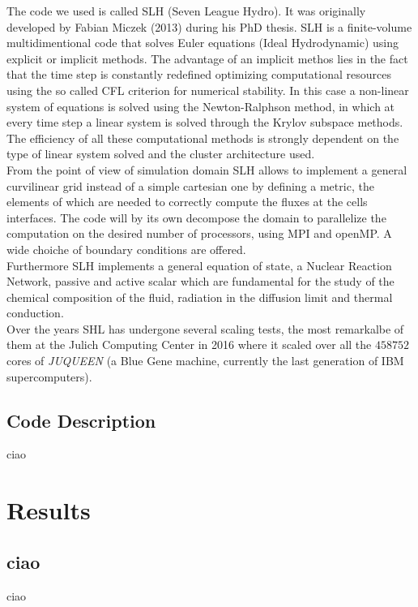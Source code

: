\documentclass[11pt]{article}
\begin{document}
The code we used is called SLH (Seven League Hydro). It was originally developed by Fabian Miczek (2013) during his PhD thesis. SLH is a finite-volume multidimentional code that solves Euler equations (Ideal Hydrodynamic) using explicit or implicit methods. The advantage of an implicit methos lies in the fact that the time step is constantly redefined optimizing computational resources using the so called CFL criterion for numerical stability. In this case a non-linear system of equations is solved using the Newton-Ralphson method, in which at every time step a linear system is solved through the Krylov subspace methods. The efficiency of all these computational methods is strongly dependent on the type of linear system solved and the cluster architecture used. \\
From the point of view of simulation domain SLH allows to implement a general curvilinear grid instead of a simple cartesian one by defining a metric, the elements of which are needed to correctly compute the fluxes at the cells interfaces. The code will by its own decompose the domain to parallelize the computation on the desired number of processors, using MPI and openMP. A wide choiche of boundary conditions are offered. \\
Furthermore SLH implements a general equation of state, a Nuclear Reaction Network, passive and active scalar which are fundamental for the study of the chemical composition of the fluid, radiation in the diffusion limit and thermal conduction. \\
Over the years SHL has undergone several scaling tests, the most remarkalbe of them at the Julich Computing Center in 2016 where it scaled over all the $458752$ cores of \textit{JUQUEEN} (a Blue Gene machine, currently the last generation of IBM supercomputers).
\subsection{Code Description}
ciao


\section{Results}
\subsection{ciao}
ciao
\end{document}
